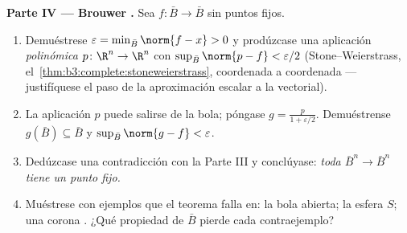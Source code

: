 \begin{problem}
\medskip
\noindent\textbf{Parte IV --- Brouwer
.} Sea
$f\colon\bar B\to\bar B$ 
sin puntos fijos.
\begin{enumerate}[resume]
  \item Demuéstrese $\varepsilon = \min_{\bar B}\norm{f - x} > 0$ y
  prodúzcase una aplicación \emph{polinómica} $p\colon\R^n\to
        \R^n$ con $\sup_{\bar B}\norm{p - f} <
        \varepsilon/2$ (Stone--Weierstrass,
  el~\cref{thm:b3:complete:stoneweierstrass}, coordenada a coordenada
  --- justifíquese el paso de la aproximación escalar a la vectorial).
  \item La aplicación $p$ puede salirse de la bola; póngase
  $g = \frac{p}{1
        + \varepsilon/2}$. Demuéstrense $g(\bar B) \subseteq \bar B$ y
  $\sup_{\bar B}\norm{g - f} < \varepsilon$. \item Dedúzcase una
  contradicción con la Parte III y conclúyase: \emph{toda
  $\bar B^n \to \bar B^n$ tiene un punto fijo.} \item Muéstrese con
  ejemplos que el teorema falla en: la bola abierta; la esfera $S$; una
  corona . ¿Qué propiedad de
  $\bar B$ pierde cada contraejemplo?
\end{enumerate}


\end{problem}
